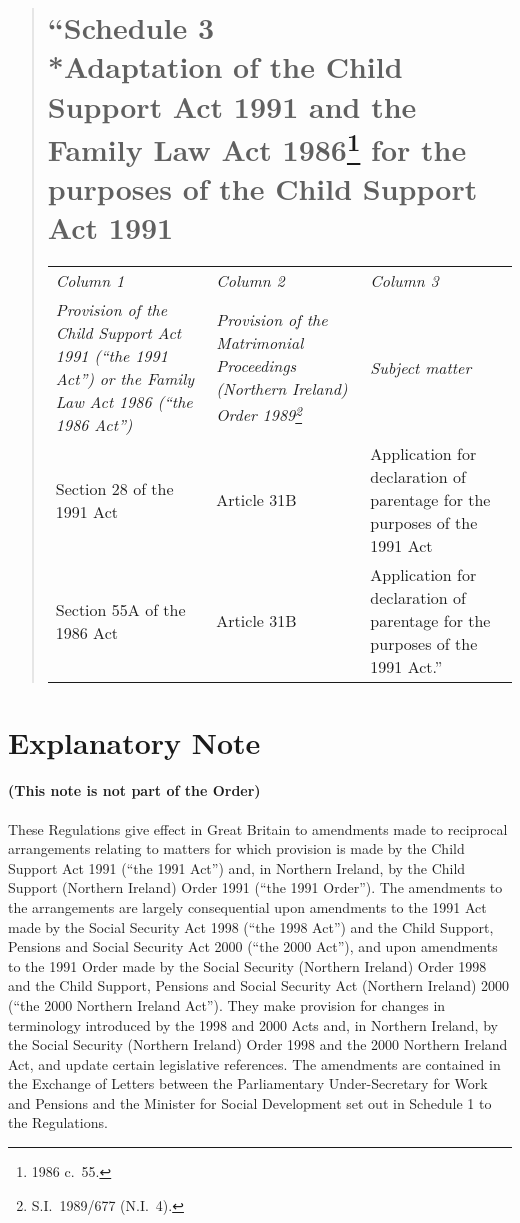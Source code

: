 \documentclass[12pt,a4paper]{article}
\begin{document}
\begin{quotation}
\part*{“Schedule 3\\*Adaptation of the Child Support Act 1991 and the Family Law Act 1986\footnote{1986 c.\ 55.} for the purposes of the Child Support Act 1991}

{\footnotesize
\begin{longtable}{p{118.60852pt}p{83.77237pt}p{92.86606pt}}
\hline
\itshape Column 1	& \itshape Column 2	& \itshape Column 3\\
\itshape Provision of the Child Support Act 1991 (“the 1991 Act”) or the Family Law Act 1986 (“the 1986 Act”)	& \itshape Provision of the Matrimonial Proceedings (Northern Ireland) Order 1989\footnote{S.I.\ 1989/677 (N.I.\ 4).}	& \itshape Subject matter\\
\hline
\endhead
\hline
\endlastfoot
Section 28 of the 1991 Act	&Article 31B	&Application for declaration of parentage for the purposes of the 1991 Act\\
Section 55A of the 1986 Act	&Article 31B	&Application for declaration of parentage for the purposes of the 1991 Act.”\\
\end{longtable}

}

\end{quotation}

\part{Explanatory Note}

\renewcommand\parthead{— Explanatory Note}

\subsection*{(This note is not part of the Order)}

These Regulations give effect in Great Britain to amendments made to reciprocal arrangements relating to matters for which provision is made by the Child Support Act 1991 (“the 1991 Act”) and, in Northern Ireland, by the Child Support (Northern Ireland) Order 1991 (“the 1991 Order”). The amendments to the arrangements are largely consequential upon amendments to the 1991 Act made by the Social Security Act 1998 (“the 1998 Act”) and the Child Support, Pensions and Social Security Act 2000 (“the 2000 Act”), and upon amendments to the 1991 Order made by the Social Security (Northern Ireland) Order 1998 and the Child Support, Pensions and Social Security Act (Northern Ireland) 2000 (“the 2000 Northern Ireland Act”). They make provision for changes in terminology introduced by the 1998 and 2000 Acts and, in Northern Ireland, by the Social Security (Northern Ireland) Order 1998 and the 2000 Northern Ireland Act, and update certain legislative references. The amendments are contained in the Exchange of Letters between the Parliamentary Under-Secretary for Work and Pensions and the Minister for Social Development set out in Schedule 1 to the Regulations.
\end{document}
